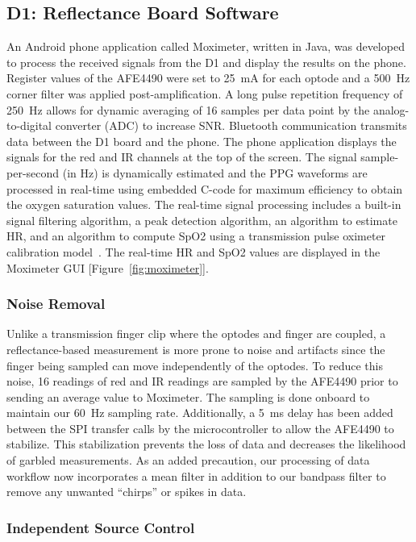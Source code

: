 \subsection{D1: Reflectance Board Software}
An Android phone application called Moximeter, written in Java, was developed to process the received signals from the D1 and display the results on the phone. Register values of the AFE4490 were set to 25~mA for each optode and a 500~Hz corner filter was applied post-amplification. A long pulse repetition frequency of 250~Hz allows for dynamic averaging of 16 samples per data point by the analog-to-digital converter (ADC) to increase SNR. Bluetooth communication transmits data between the D1 board and the phone. The phone application displays the signals for the red and IR channels at the top of the screen. The signal sample-per-second (in Hz) is dynamically estimated and the PPG waveforms are processed in real-time using embedded C-code for maximum efficiency to obtain the oxygen saturation values. The real-time signal processing includes a built-in signal filtering algorithm, a peak detection algorithm, an algorithm to estimate HR, and an algorithm to compute SpO2 using a transmission pulse oximeter calibration model~\cite{Bailey2008}. The real-time HR and SpO2 values are displayed in the Moximeter GUI [Figure~\ref{fig:moximeter}]. 
    
\subsubsection{Noise Removal}
Unlike a transmission finger clip where the optodes and finger are coupled, a reflectance-based measurement is more prone to noise and artifacts since the finger being sampled can move independently of the optodes. To reduce this noise, 16 readings of red and IR readings are sampled by the AFE4490 prior to sending an average value to Moximeter. The sampling is done onboard to maintain our 60~Hz sampling rate. Additionally, a 5~ms delay has been added between the SPI transfer calls by the microcontroller to allow the AFE4490 to stabilize. This stabilization prevents the loss of data and decreases the likelihood of garbled measurements. As an added precaution, our processing of data workflow now incorporates a mean filter in addition to our bandpass filter to remove any unwanted ``chirps'' or spikes in data. 
        
\subsubsection{Independent Source Control}

